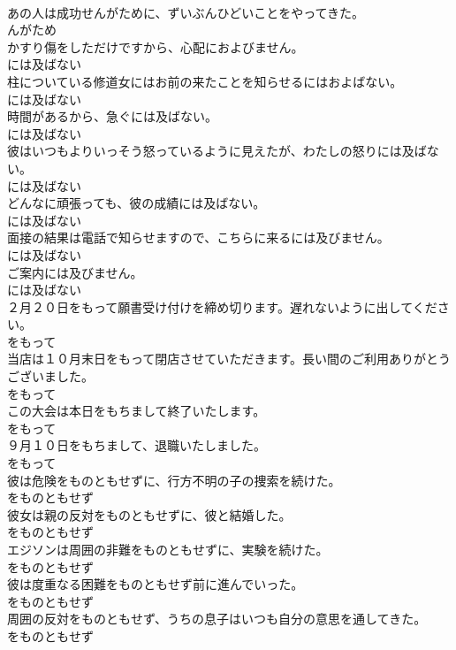 \documentclass[8pt]{extreport}
\begin{document}
\begin{CJK}{UTF8}{min}
\\	あの人は成功せんがために、ずいぶんひどいことをやってきた。	
\\	んがため	
\\	かすり傷をしただけですから、心配におよびません。	
\\	には及ばない	
\\	柱についている修道女にはお前の来たことを知らせるにはおよばない。	
\\	には及ばない	
\\	時間があるから、急ぐには及ばない。	
\\	には及ばない	
\\	彼はいつもよりいっそう怒っているように見えたが、わたしの怒りには及ばない。	
\\	には及ばない	
\\	どんなに頑張っても、彼の成績には及ばない。	
\\	には及ばない	
\\	面接の結果は電話で知らせますので、こちらに来るには及びません。	
\\	には及ばない	
\\	ご案内には及びません。	
\\	には及ばない	
\\	２月２０日をもって願書受け付けを締め切ります。遅れないように出してください。	
\\	をもって	
\\	当店は１０月末日をもって閉店させていただきます。長い間のご利用ありがとうございました。	
\\	をもって	
\\	この大会は本日をもちまして終了いたします。	
\\	をもって	
\\	９月１０日をもちまして、退職いたしました。	
\\	をもって	
\\	彼は危険をものともせずに、行方不明の子の捜索を続けた。	
\\	をものともせず	
\\	彼女は親の反対をものともせずに、彼と結婚した。	
\\	をものともせず	
\\	エジソンは周囲の非難をものともせずに、実験を続けた。	
\\	をものともせず	
\\	彼は度重なる困難をものともせず前に進んでいった。	
\\	をものともせず	
\\	周囲の反対をものともせず、うちの息子はいつも自分の意思を通してきた。	
\\	をものともせず	

\end{CJK}
\end{document}
